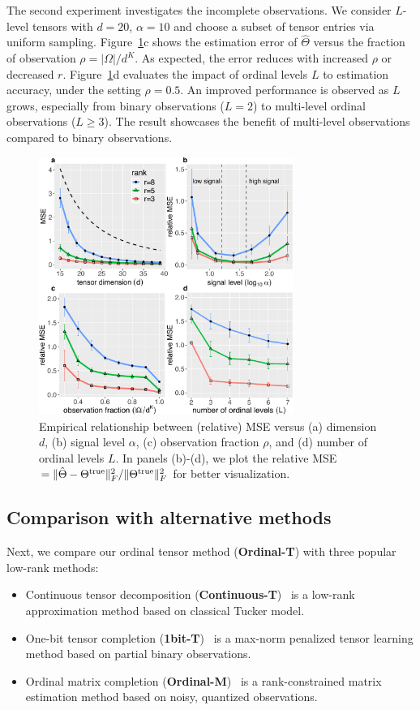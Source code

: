 \documentclass{article}
\theoremstyle{plain}
\theoremstyle{definition}
\begin{document}
The second experiment investigates the incomplete observations. We consider $L$-level tensors with $d=20$, $\alpha=10$ and choose a subset of tensor entries via uniform sampling. Figure~\ref{fig:finite}c shows the estimation error of $\hat \Theta$ versus the fraction of observation $\rho=|\Omega|/d^K$. As expected, the error reduces with increased $\rho$ or decreased $r$. Figure~\ref{fig:finite}d evaluates the impact of ordinal levels $L$ to estimation accuracy, under the setting $\rho=0.5$. An improved performance is observed as $L$ grows, especially from binary observations ($L=2$) to multi-level ordinal observations ($L\geq 3$). The result showcases the benefit of multi-level observations compared to binary observations.

\begin{figure}[http]
\includegraphics[width=8.3cm]{panel.pdf}
\vspace{-.2cm}
\caption{Empirical relationship between (relative) MSE versus (a) dimension $d$, (b) signal level $\alpha$, (c) observation fraction $\rho$, and (d) number of ordinal levels $L$. In panels (b)-(d), we plot the relative MSE $=\lVert\hat \Theta-\Theta^{\mathrm{true}}\rVert_F^2/\lVert\Theta^{\mathrm{true}}\rVert_F^2$ for better visualization.}
\label{fig:finite}
\vspace{-.3cm}
\end{figure}


\subsection{Comparison with alternative methods}
Next, we compare our ordinal tensor method ({\bf Ordinal-T}) with three popular low-rank methods:

\begin{itemize}[itemsep=0pt,topsep=0pt,leftmargin=*,partopsep=0pt]
\item Continuous tensor decomposition ({\bf Continuous-T})~\cite{acar2010scalable} is a low-rank approximation method based on classical Tucker model.
\item One-bit tensor completion ({\bf 1bit-T})~\cite{ghadermarzy2018learning} is a max-norm penalized tensor learning method based on partial binary observations.
\item Ordinal matrix completion ({\bf Ordinal-M})~\cite{bhaskar2016probabilistic} is a rank-constrained matrix estimation method based on noisy, quantized observations.
\end{itemize}
\end{document}
